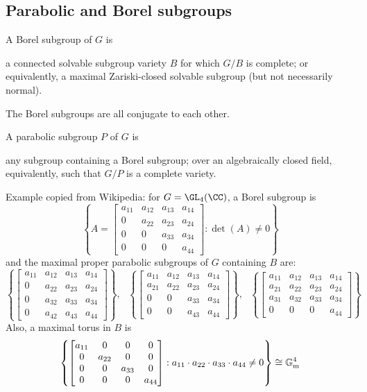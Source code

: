 \subsection{Parabolic and Borel subgroups}
\begin{definition}
  A \alert{Borel subgroup} of $G$ is
  \begin{itemize}
    \ii a connected solvable subgroup variety $B$ for which $G/B$ is complete;
    \ii or equivalently, a maximal Zariski-closed solvable subgroup (but not necessarily normal).
  \end{itemize}
\end{definition}
The Borel subgroups are all conjugate to each other.

\begin{definition}
  A \alert{parabolic subgroup} $P$ of $G$ is
  \begin{itemize}
    \ii any subgroup containing a Borel subgroup;
    \ii over an algebraically closed field, equivalently,
    such that $G/P$ is a complete variety.
  \end{itemize}
\end{definition}

Example copied from Wikipedia: for $G = \GL_4(\CC)$, a Borel subgroup is
\[ \left\{A={\begin{bmatrix}a_{11}&a_{12}&a_{13}&a_{14}\\0&a_{22}&a_{23}&a_{24}\\0&0&a_{33}&a_{34}\\0&0&0&a_{44}\end{bmatrix}}:\det(A)\neq 0\right\}
\]
and the maximal proper parabolic subgroups of $G$ containing $B$ are:
\[
{\displaystyle \left\{{\begin{bmatrix}a_{11}&a_{12}&a_{13}&a_{14}\\0&a_{22}&a_{23}&a_{24}\\0&a_{32}&a_{33}&a_{34}\\0&a_{42}&a_{43}&a_{44}\end{bmatrix}}\right\},{\text{ }}\left\{{\begin{bmatrix}a_{11}&a_{12}&a_{13}&a_{14}\\a_{21}&a_{22}&a_{23}&a_{24}\\0&0&a_{33}&a_{34}\\0&0&a_{43}&a_{44}\end{bmatrix}}\right\},{\text{ }}\left\{{\begin{bmatrix}a_{11}&a_{12}&a_{13}&a_{14}\\a_{21}&a_{22}&a_{23}&a_{24}\\a_{31}&a_{32}&a_{33}&a_{34}\\0&0&0&a_{44}\end{bmatrix}}\right\}}
\]
Also, a maximal torus in $B$ is
\[ \left\{{\begin{bmatrix}a_{11}&0&0&0\\0&a_{22}&0&0\\0&0&a_{33}&0\\0&0&0&a_{44}\end{bmatrix}}:a_{11}\cdot a_{22}\cdot a_{33}\cdot a_{44}\neq 0\right\}
  \cong \mathbb{G}_{\mathrm{m}}^4
\]

